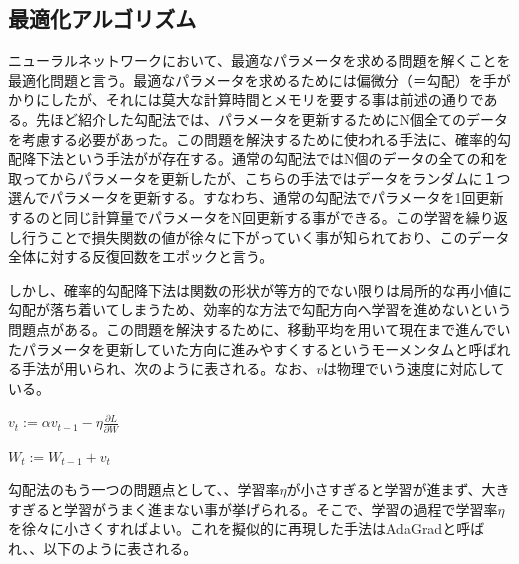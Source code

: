 \documentclass{report}
\begin{document}
\subsection{最適化アルゴリズム}

ニューラルネットワークにおいて、最適なパラメータを求める問題を解くことを最適化問題と言う。最適なパラメータを求めるためには偏微分（＝勾配）を手がかりにしたが、それには莫大な計算時間とメモリを要する事は前述の通りである。先ほど紹介した勾配法では、パラメータを更新するためにN個全てのデータを考慮する必要があった。この問題を解決するために使われる手法に、確率的勾配降下法という手法がが存在する。通常の勾配法ではN個のデータの全ての和を取ってからパラメータを更新したが、こちらの手法ではデータをランダムに１つ選んでパラメータを更新する。すなわち、通常の勾配法でパラメータを1回更新するのと同じ計算量でパラメータをN回更新する事ができる。この学習を繰り返し行うことで損失関数の値が徐々に下がっていく事が知られており、このデータ全体に対する反復回数をエポックと言う。

しかし、確率的勾配降下法は関数の形状が等方的でない限りは局所的な再小値に勾配が落ち着いてしまうため、効率的な方法で勾配方向へ学習を進めないという問題点がある。この問題を解決するために、移動平均を用いて現在まで進んでいたパラメータを更新していた方向に進みやすくするというモーメンタムと呼ばれる手法が用いられ、次のように表される。なお、\begin{math}v\end{math}は物理でいう速度に対応している。


\begin{center}
\begin{math}
v_t := \alpha v_{t-1} - \eta  \frac{\partial L}{\partial W}
\end{math}
\end{center}

\begin{center}
\begin{math}
W_t := W_{t-1} + v_t
\end{math}
\end{center}


勾配法のもう一つの問題点として、、学習率\begin{math}\eta\end{math}が小さすぎると学習が進まず、大きすぎると学習がうまく進まない事が挙げられる。そこで、学習の過程で学習率\begin{math}\eta\end{math}を徐々に小さくすればよい。これを擬似的に再現した手法はAdaGradと呼ばれ、、以下のように表される。
\end{document}

